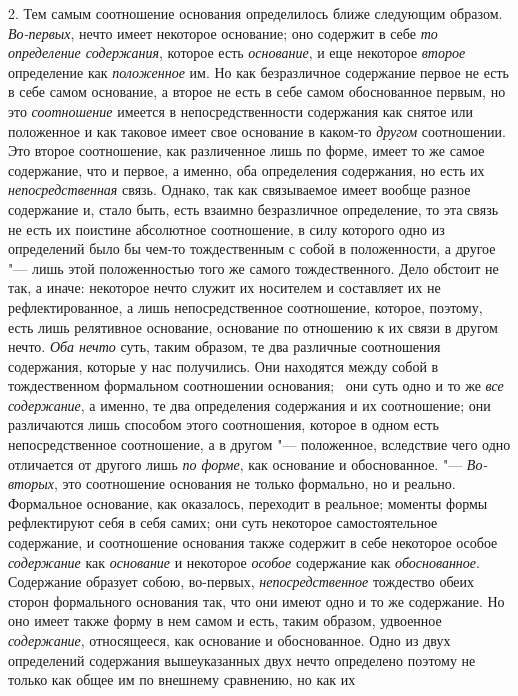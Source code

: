 2. Тем самым соотношение основания определилось ближе следующим образом.
{\em Во-первых}, нечто имеет некоторое основание; оно
содержит в себе {\em то определение содержания},
которое есть {\em основание}, и еще некоторое
{\em второе} определение как
{\em положенное} им. Но как безразличное содержание
первое не есть в себе самом основание, а второе не есть в себе самом
обоснованное первым, но это {\em соотношение} имеется в
непосредственности содержания как снятое или положенное и как таковое имеет
свое основание в каком-то {\em другом} соотношении. Это
второе соотношение, как различенное лишь по форме, имеет то же самое
содержание, что и первое, а именно, оба определения содержания, но есть их
{\em непосредственная} связь. Однако, так как
связываемое имеет вообще разное содержание и, стало быть, есть взаимно
безразличное определение, то эта связь не есть их поистине абсолютное
соотношение, в силу которого одно из определений было бы чем-то
тождественным с собой в положенности, а другое "--- лишь этой положенностью
того же самого тождественного. Дело обстоит не так, а иначе: некоторое
нечто служит их носителем и составляет их не рефлектированное, а лишь
непосредственное соотношение, которое, поэтому, есть лишь релятивное
основание, основание по отношению к их связи в другом нечто.
{\em Оба нечто} суть, таким образом, те два различные
соотношения содержания, которые у нас получились. Они находятся между собой
в тождественном формальном соотношении основания; \ они суть одно и то же
{\em все содержание}, а именно, те два определения
содержания и их соотношение; они различаются лишь способом этого
соотношения, которое в одном есть непосредственное соотношение, а в другом
"--- положенное, вследствие чего одно отличается от другого лишь
{\em по форме}, как основание и обоснованное. "---
{\em Во-вторых}, это соотношение основания не только
формально, но и реально. Формальное основание, как оказалось, переходит в
реальное; моменты формы рефлектируют себя в себя самих; они суть некоторое
самостоятельное содержание, и соотношение основания также содержит в себе
некоторое особое {\em содержание} как
{\em основание} и некоторое
{\em особое} содержание как
{\em обоснованное}. Содержание образует собою,
во-первых, {\em непосредственное} тождество обеих
сторон формального основания так, что они имеют одно и то же содержание. Но
оно имеет также форму в нем самом и есть, таким образом, удвоенное
{\em содержание}, относящееся, как основание и
обоснованное. Одно из двух определений содержания вышеуказанных двух нечто
определено поэтому не только как общее им по внешнему сравнению, но как их
